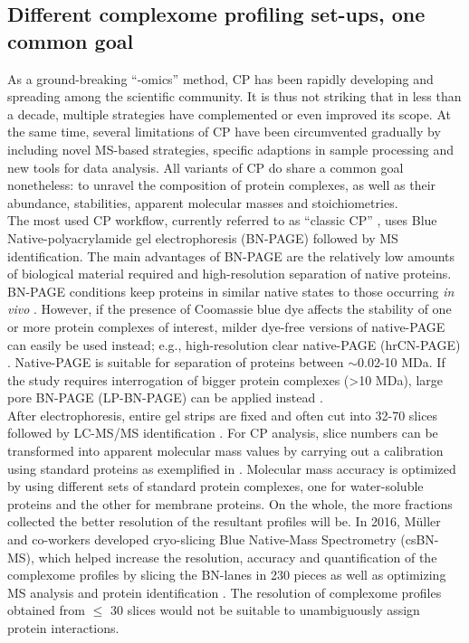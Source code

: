\subsection*{Different complexome profiling set-ups, one common goal}\label{ssec:CP_MS_ssec1}
As a ground-breaking “-omics” method, CP has been rapidly developing and spreading among the scientific community. It is thus not striking that in less than a decade, multiple strategies have complemented or even improved its scope. At the same time, several limitations of CP have been circumvented gradually by including novel MS-based strategies, specific adaptions in sample processing and new tools for data analysis. All variants of CP do share a common goal nonetheless: to unravel the composition of protein complexes, as well as their abundance, stabilities, apparent molecular masses and stoichiometries.\\
The most used CP workflow, currently referred to as “classic CP” \cite{Wittig_2021}, uses Blue Native-polyacrylamide gel electrophoresis (BN-PAGE) followed by MS identification. The main advantages of BN-PAGE are the relatively low amounts of biological material required and high-resolution separation of native proteins. BN-PAGE conditions keep proteins in similar native states to those occurring \emph{in vivo} \cite{Wittig_2006}. However, if the presence of Coomassie blue dye affects the stability of one or more protein complexes of interest, milder dye-free versions of native-PAGE can easily be used instead; e.g., high-resolution clear native-PAGE (hrCN-PAGE) \cite{Ladig_2011, Wittig_2007}. Native-PAGE is suitable for separation of proteins between $\sim$0.02-10 MDa. If the study requires interrogation of bigger protein complexes (>10 MDa), large pore BN-PAGE (LP-BN-PAGE) can be applied instead \cite{Heide_2012, Strecker_2010}.\\
After electrophoresis, entire gel strips are fixed and often cut into 32-70 slices followed by LC-MS/MS identification \cite{Giese_2021, Heide_2012, Senkler_2017, Vidoni_2017}. For CP analysis, slice numbers can be transformed into apparent molecular mass values by carrying out a calibration using standard proteins as exemplified in \cite{Heide_2012, Wittig_2010}. Molecular mass accuracy is optimized by using different sets of standard protein complexes, one for water-soluble proteins and the other for membrane proteins. On the whole, the more fractions collected the better resolution of the resultant profiles will be. In 2016, Müller and co-workers developed cryo-slicing Blue Native-Mass Spectrometry (csBN-MS), which helped increase the resolution, accuracy and quantification of the complexome profiles by slicing the BN-lanes in 230 pieces as well as optimizing MS analysis and protein identification \cite{Muller_2016}. The resolution of complexome profiles obtained from \(\leq\) 30 slices would not be suitable to unambiguously assign protein interactions.\\

